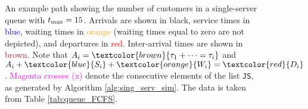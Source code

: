 \begin{figure}[H]
\caption{
An example path showing the number of customers in a single-server queue with $t_{\rm max} = 15$.
Arrivals are shown in black,
service times in \textcolor{blue}{blue}, waiting times in \textcolor{orange}{orange} (waiting times equal to zero are not depicted),
and departures in \textcolor{red}{red}.
Inter-arrival times are shown in \textcolor{brown}{brown}.
Note that $A_i=\textcolor{brown}{\tau_1+\cdots=\tau_i}$ and $A_i+\textcolor{blue}{S_i}+\textcolor{orange}{W_i}=\textcolor{red}{D_i}$.
\textcolor{magenta}{Magenta crosses (x)} denote the consecutive elements of the list \texttt{JS},
as generated by Algorithm  \ref{alg:sing_serv_sim}.
The data is taken from Table  \ref{tab:queue_FCFS}.
}

\label{fig:single_serv_queue}
\end{figure}


